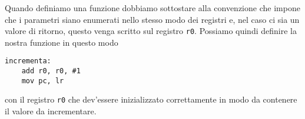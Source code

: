 Quando definiamo una funzione dobbiamo sottostare alla convenzione che impone che i parametri siano
enumerati nello stesso modo dei registri e, nel caso ci sia un valore di ritorno, questo venga
scritto sul registro \verb|r0|. Possiamo quindi definire la nostra funzione in questo modo
\begin{verbatim}
incrementa:
	add r0, r0, #1
	mov pc, lr
\end{verbatim}
con il registro \verb|r0| che dev'essere inizializzato correttamente in modo da contenere il valore
da incrementare.
